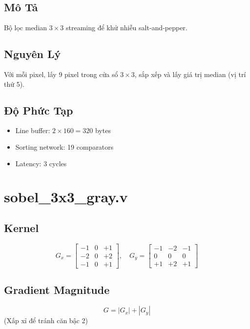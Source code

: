 \documentclass[12pt,a4paper]{article}
\begin{document}
\subsection{Mô Tả}
Bộ lọc median $3\times3$ streaming để khử nhiễu salt-and-pepper.

\subsection{Nguyên Lý}
Với mỗi pixel, lấy 9 pixel trong cửa sổ $3\times3$, sắp xếp và lấy giá trị median (vị trí thứ 5).

\subsection{Độ Phức Tạp}
\begin{itemize}
    \item Line buffer: $2 \times 160 = 320$ bytes
    \item Sorting network: 19 comparators
    \item Latency: 3 cycles
\end{itemize}

\section{sobel\_3x3\_gray.v}

\subsection{Kernel}
\begin{equation}
G_x = \begin{bmatrix} -1 & 0 & +1 \\ -2 & 0 & +2 \\ -1 & 0 & +1 \end{bmatrix}, \quad
G_y = \begin{bmatrix} -1 & -2 & -1 \\ 0 & 0 & 0 \\ +1 & +2 & +1 \end{bmatrix}
\end{equation}

\subsection{Gradient Magnitude}
\begin{equation}
G = |G_x| + |G_y|
\end{equation}
(Xấp xỉ để tránh căn bậc 2)
\end{document}
